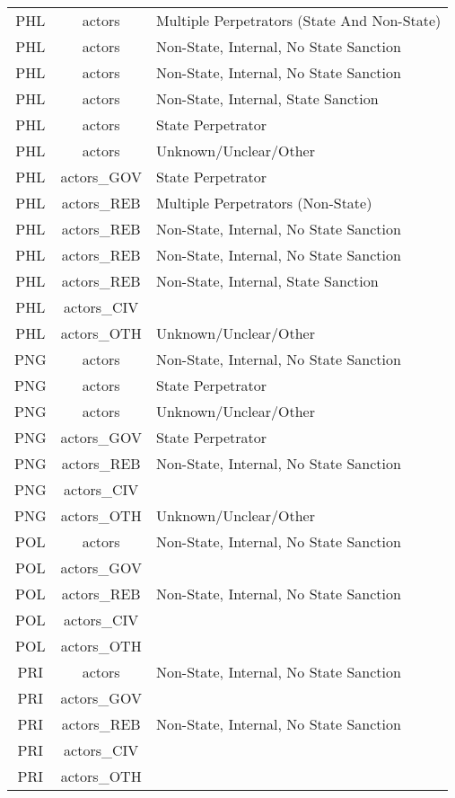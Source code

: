 \documentclass[12pt]{article}
\begin{document}
\begin{center}
\begin{longtable}{|c|c|p{10cm}|}
  PHL & actors & Multiple Perpetrators (State And Non-State) \\ 
  PHL & actors & Non-State, Internal, No State Sanction \\ 
  PHL & actors & Non-State, Internal, No State Sanction \\ 
  PHL & actors & Non-State, Internal, State Sanction \\ 
  PHL & actors & State Perpetrator \\ 
  PHL & actors & Unknown/Unclear/Other \\ 
  PHL & actors\_GOV & State Perpetrator \\ 
  PHL & actors\_REB & Multiple Perpetrators (Non-State) \\ 
  PHL & actors\_REB & Non-State, Internal, No State Sanction \\ 
  PHL & actors\_REB & Non-State, Internal, No State Sanction \\ 
  PHL & actors\_REB & Non-State, Internal, State Sanction \\ 
  PHL & actors\_CIV &  \\ 
  PHL & actors\_OTH & Unknown/Unclear/Other \\ 
  PNG & actors & Non-State, Internal, No State Sanction \\ 
  PNG & actors & State Perpetrator \\ 
  PNG & actors & Unknown/Unclear/Other \\ 
  PNG & actors\_GOV & State Perpetrator \\ 
  PNG & actors\_REB & Non-State, Internal, No State Sanction \\ 
  PNG & actors\_CIV &  \\ 
  PNG & actors\_OTH & Unknown/Unclear/Other \\ 
  POL & actors & Non-State, Internal, No State Sanction \\ 
  POL & actors\_GOV &  \\ 
  POL & actors\_REB & Non-State, Internal, No State Sanction \\ 
  POL & actors\_CIV &  \\ 
  POL & actors\_OTH &  \\ 
  PRI & actors & Non-State, Internal, No State Sanction \\ 
  PRI & actors\_GOV &  \\ 
  PRI & actors\_REB & Non-State, Internal, No State Sanction \\ 
  PRI & actors\_CIV &  \\ 
  PRI & actors\_OTH &  \\ 

\end{longtable}
\end{center}
\end{document}
